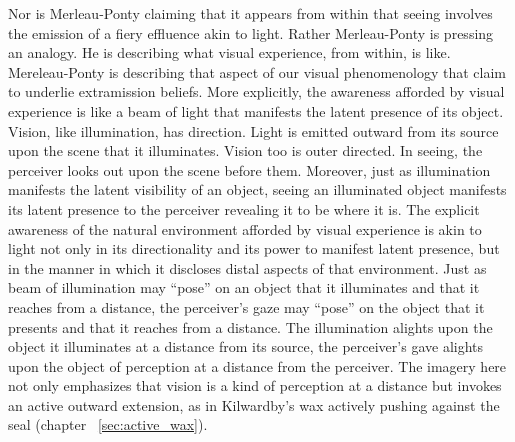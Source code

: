 Nor is Merleau-Ponty claiming that it appears from within that seeing involves the emission of a fiery effluence akin to light. Rather Merleau-Ponty is pressing an analogy. He is describing what visual experience, from within, is like. Mereleau-Ponty is describing that aspect of our visual phenomenology that \citet{Winer:1996as} claim to underlie extramission beliefs. More explicitly, the awareness afforded by visual experience is like a beam of light that manifests the latent presence of its object. Vision, like illumination, has direction. Light is emitted outward from its source upon the scene that it illuminates.  Vision too is outer directed. In seeing, the perceiver looks out upon the scene before them. Moreover, just as illumination manifests the latent visibility of an object, seeing an illuminated object manifests its latent presence to the perceiver revealing it to be where it is. The explicit awareness of the natural environment afforded by visual experience is akin to light not only in its directionality and its power to manifest latent presence, but in the manner in which it discloses distal aspects of that environment. Just as beam of illumination may ``pose'' on an object that it illuminates and that it reaches from a distance, the perceiver's gaze may ``pose'' on the object that it presents and that it reaches from a distance. The illumination alights upon the object it illuminates at a distance from its source, the perceiver's gave alights upon the object of perception at a distance from the perceiver. The imagery here not only emphasizes that vision is a kind of perception at a distance but invokes an active outward extension, as in Kilwardby's wax actively pushing against the seal (chapter ~\ref{sec:active_wax}).

